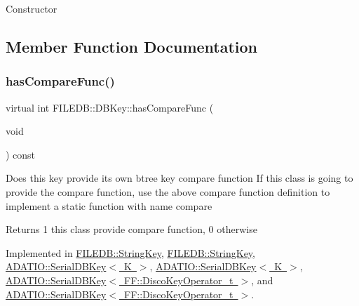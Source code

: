 Constructor 

\subsection{Member Function Documentation}
\mbox{\label{classFILEDB_1_1DBKey_a416c32ba10caf76e6b7ff4986cfc3c05}} 
\subsubsection{\texorpdfstring{hasCompareFunc()}{hasCompareFunc()}\hspace{0.1cm}{\footnotesize\ttfamily [1/2]}}
{\footnotesize\ttfamily virtual int F\+I\+L\+E\+D\+B\+::\+D\+B\+Key\+::has\+Compare\+Func (\begin{DoxyParamCaption}\item[{void}]{ }\end{DoxyParamCaption}) const\hspace{0.3cm}{\ttfamily [pure virtual]}}

Does this key provide its own btree key compare function If this class is going to provide the compare function, use the above compare function definition to implement a static function with name compare

\begin{DoxyReturn}{Returns}
1 this class provide compare function, 0 otherwise 
\end{DoxyReturn}


Implemented in \mbox{\hyperlink{classFILEDB_1_1StringKey_a430c4d6d22db7160c501c1703f9f13cf}{F\+I\+L\+E\+D\+B\+::\+String\+Key}}, \mbox{\hyperlink{classFILEDB_1_1StringKey_a430c4d6d22db7160c501c1703f9f13cf}{F\+I\+L\+E\+D\+B\+::\+String\+Key}}, \mbox{\hyperlink{classADATIO_1_1SerialDBKey_a2f28d2ac39919d9cb9f6fc097944c49c}{A\+D\+A\+T\+I\+O\+::\+Serial\+D\+B\+Key$<$ K $>$}}, \mbox{\hyperlink{classADATIO_1_1SerialDBKey_a2f28d2ac39919d9cb9f6fc097944c49c}{A\+D\+A\+T\+I\+O\+::\+Serial\+D\+B\+Key$<$ K $>$}}, \mbox{\hyperlink{classADATIO_1_1SerialDBKey_a2f28d2ac39919d9cb9f6fc097944c49c}{A\+D\+A\+T\+I\+O\+::\+Serial\+D\+B\+Key$<$ F\+F\+::\+Disco\+Key\+Operator\+\_\+t $>$}}, and \mbox{\hyperlink{classADATIO_1_1SerialDBKey_a2f28d2ac39919d9cb9f6fc097944c49c}{A\+D\+A\+T\+I\+O\+::\+Serial\+D\+B\+Key$<$ F\+F\+::\+Disco\+Key\+Operator\+\_\+t $>$}}.

\mbox{\label{classFILEDB_1_1DBKey_a416c32ba10caf76e6b7ff4986cfc3c05}} 
